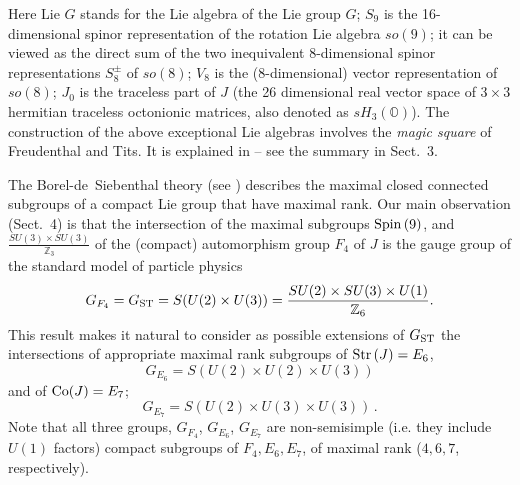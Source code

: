 \documentclass{article}
\newcommand{\be}{\begin{equation}}
\newcommand{\ee}{\end{equation}}
\begin{document}
\noindent Here Lie $G$ stands for the Lie algebra of the Lie group $G$; $S_9$ is the 16-dimensional spinor representation of the rotation Lie algebra $so (9)$; it can be viewed as the direct sum of the two inequivalent 8-dimensional spinor representations $S_8^{\pm}$ of $so (8)$; $V_8$ is the (8-dimensional) vector representation of $so (8)$; $J_0$ is the traceless part of $J$ (the 26 dimensional real vector space of $3 \times 3$ hermitian traceless octonionic matrices, also denoted as $sH_3 ({\mathbb O})$). The construction of the above exceptional Lie algebras involves the {\it magic square} of Freudenthal and Tits. It is explained in \cite{BS,B} -- see the summary in Sect.~3.

\smallskip

The Borel-de~Siebenthal theory (see \cite{BdS, K}) describes the maximal closed connected subgroups of a compact Lie group that have maximal rank. Our main observation (Sect.~4) is that the intersection of the maximal subgroups ${\rm Spin} \, (9)$, and 
$\frac{SU (3) \times SU (3)}{{\mathbb Z}_3}$ of the (compact) automorphism group $F_4$ of $J$ is the gauge group of the standard model of particle physics
\be
\label{eq14}
G_{F_4} = G_{\rm ST} = S(U(2) \times U(3)) = \frac{SU (2) \times SU (3) \times U(1)}{{\mathbb Z}_6}.
\ee
This result makes it natural to consider as possible extensions of $G_{\rm ST}$ the intersections of appropriate maximal rank subgroups of ${\rm Str} \, (J) = E_6$,
\be
\label{eq15}
G_{E_6} = S(U(2) \times U(2) \times U(3)) 
\ee
and of ${\rm Co} (J) = E_7$;
\be
\label{eq16}
G_{E_7} = S(U(2) \times U(3) \times U(3)) \, .
\ee
Note that all three groups, $G_{F_4}$, $G_{E_6}$, $G_{E_7}$ are non-semisimple (i.e. they include $U(1)$ factors) compact subgroups of $F_4 , E_6 , E_7$, of maximal rank ($4,6,7$, respectively).

\smallskip
\end{document}
